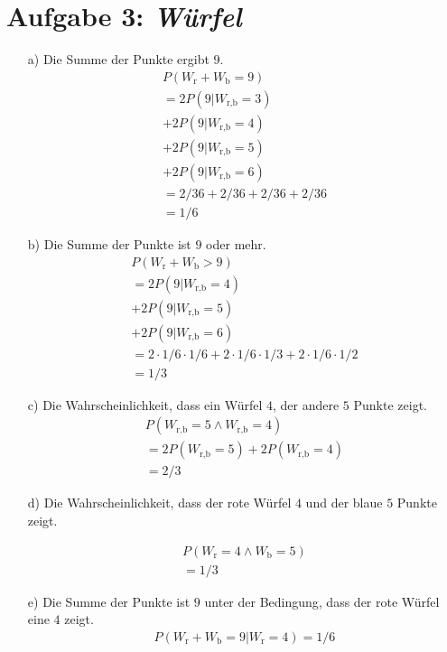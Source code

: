 \section*{Aufgabe 3: \emph{Würfel}}
\begin{itemize}
\item[a)] Die Summe der Punkte ergibt $9$. 
\begin{align*}
P(W_{\text{r}} + W_{\text{b}} = 9) \\
 = 2P(9|W_{\text{r,b}} = 3 ) \\
 + 2P(9|W_{\text{r,b}} = 4 ) \\
 + 2P(9|W_{\text{r,b}} = 5 ) \\
 + 2P(9|W_{\text{r,b}} = 6 ) \\
 = 2/36 + 2/36 + 2/36 + 2/36 \\
 = 1/6
\end{align*}

\item[b)] Die Summe der Punkte ist $9$ oder mehr.
\begin{align*}
P(W_{\text{r}} + W_{\text{b}} > 9) \\
 = 2P(9|W_{\text{r,b}} = 4 ) \\
 + 2P(9|W_{\text{r,b}} = 5 ) \\
 + 2P(9|W_{\text{r,b}} = 6 ) \\
 = 2 \cdot 1/6 \cdot 1/6 + 2 \cdot 1/6 \cdot 1/3 + 2 \cdot 1/6 \cdot 1/2 \\
 = 1/3
\end{align*}

\item[c)] Die Wahrscheinlichkeit, dass ein Würfel $4$, der andere $5$ Punkte zeigt.
\begin{align*}
P(W_{\text{r,b}} = 5 \land W_{\text{r,b}}=4)\\
= 2P(W_{\text{r,b}} = 5) + 2P(W_{\text{r,b}} = 4)\\
= 2/3
\end{align*}

\item[d)] Die Wahrscheinlichkeit, dass der rote Würfel $4$ und 
der blaue $5$ Punkte zeigt.

\begin{align*}
P(W_{\text{r}} = 4 \land W_{\text{b}}=5)\\
= 1/3
\end{align*}

\item[e)] Die Summe der Punkte ist $9$ unter der Bedingung, dass der rote Würfel eine $4$ zeigt.
\begin{align*}
P(W_{\text{r}} + W_{\text{b}} = 9|W_{\text{r}} = 4)
= 1/6
\end{align*}



\end{itemize}
